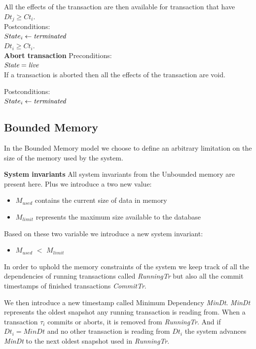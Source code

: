\documentclass[systeme]{compas2022}
\begin{document}
All the effects of the transaction are then available for transaction that have $Dt_j \geq Ct_i$.\\

Postconditions:\\
$State_i \leftarrow \emph{terminated}$ \\
$Dt_i \geq Ct_i$.\\



\textbf{Abort transaction}
Preconditions:\\ 
$\emph{State} = \emph{live}$ \\

If a transaction is aborted then all the effects of the transaction are void.

Postconditions:\\
$State_i \leftarrow \emph{terminated}$ \\

\subsection{Bounded Memory}

In the Bounded Memory model we choose to define an arbitrary limitation on the size of the memory used by the system.

\textbf{System invariants}
All system invariants from the Unbounded memory are present here.
Plus we introduce a two new value:
\begin{itemize}
  \item \emph{$M_{used}$} contains the current size of data in memory
  \item \emph{$M_{limit}$} represents the maximum size available to the database
\end{itemize}
Based on these two variable we introduce a new system invariant:
\begin{itemize}
  \item \emph{$M_{used}$} $<$ \emph{$M_{limit}$}
\end{itemize}
In order to uphold the memory constraints of the system we keep track of all the dependencies of running transactions called \emph{RunningTr} but also all the commit timestamps of finished transactions \emph{CommitTr}.

We then introduce a new timestamp called Minimum Dependency \emph{MinDt}.
\emph{MinDt} represents the oldest snapshot any running transaction is reading from.
When a transaction $\tau_i$ commits or aborts, it is removed from \emph{RunningTr}. 
And if $Dt_i = MinDt$ and no other transaction is reading from $Dt_i$ the system advances \emph{MinDt} to the next oldest snapshot used in \emph{RunningTr}.
\end{document}
